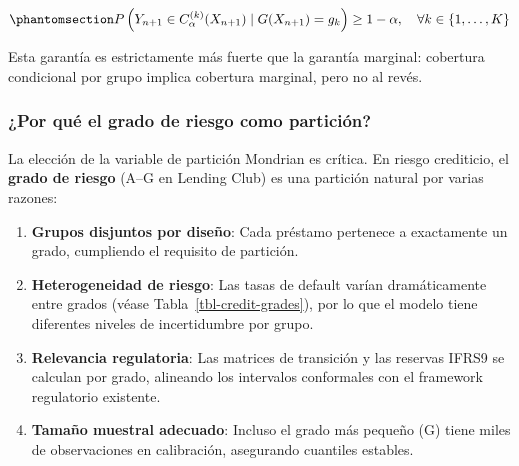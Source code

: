 \documentclass[
  spanish,
  11pt,
  letterpaper,
]{scrbook}
\providecommand{\tightlist}{%
  \setlength{\itemsep}{0pt}\setlength{\parskip}{0pt}}
\theoremstyle{plain}
\theoremstyle{remark}
\begin{document}
\begin{equation}\protect\phantomsection\label{eq-mondrian-coverage}{
P\left(Y_{n+1} \in C_\alpha^{(k)}(X_{n+1}) \mid G(X_{n+1}) = g_k\right) \geq 1 - \alpha, \quad \forall k \in \{1, \ldots, K\}
}\end{equation}

Esta garantía es estrictamente más fuerte que la garantía marginal:
cobertura condicional por grupo implica cobertura marginal, pero no al
revés.

\subsubsection{¿Por qué el grado de riesgo como
partición?}\label{sec-grade-partition}

La elección de la variable de partición Mondrian es crítica. En riesgo
crediticio, el \textbf{grado de riesgo} (A--G en Lending Club) es una
partición natural por varias razones:

\begin{enumerate}
\def\labelenumi{\arabic{enumi}.}
\tightlist
\item
  \textbf{Grupos disjuntos por diseño}: Cada préstamo pertenece a
  exactamente un grado, cumpliendo el requisito de partición.
\item
  \textbf{Heterogeneidad de riesgo}: Las tasas de default varían
  dramáticamente entre grados (véase Tabla~\ref{tbl-credit-grades}), por
  lo que el modelo tiene diferentes niveles de incertidumbre por grupo.
\item
  \textbf{Relevancia regulatoria}: Las matrices de transición y las
  reservas IFRS9 se calculan por grado, alineando los intervalos
  conformales con el framework regulatorio existente.
\item
  \textbf{Tamaño muestral adecuado}: Incluso el grado más pequeño (G)
  tiene miles de observaciones en calibración, asegurando cuantiles
  estables.
\end{enumerate}
\end{document}
